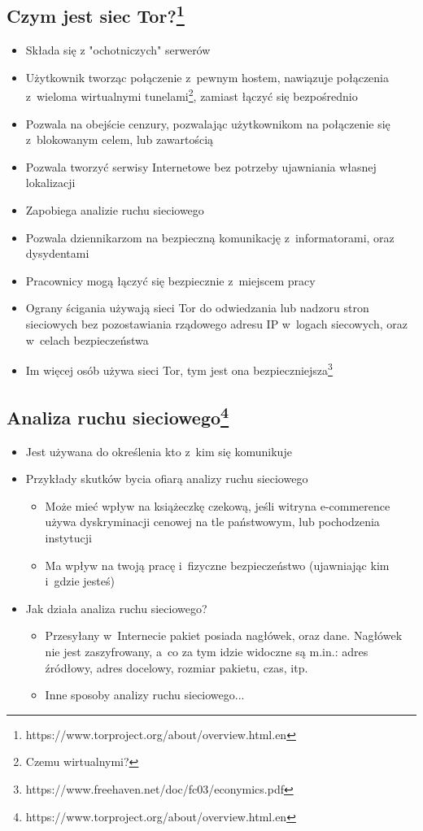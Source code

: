 \subsection{Czym jest siec Tor?\protect\footnote{https://www.torproject.org/about/overview.html.en}}
\begin{itemize}
 \item Składa się z "ochotniczych" serwerów
 \item Użytkownik tworząc połączenie z~pewnym hostem, nawiązuje połączenia z~wieloma wirtualnymi tunelami\footnote{Czemu wirtualnymi?}, zamiast łączyć się bezpośrednio
 \item Pozwala na obejście cenzury, pozwalając użytkownikom na połączenie się z~blokowanym celem, lub zawartością
 \item Pozwala tworzyć serwisy Internetowe bez potrzeby ujawniania własnej lokalizacji
 \item Zapobiega analizie ruchu sieciowego
 \item Pozwala dziennikarzom na bezpieczną komunikację z~informatorami, oraz dysydentami
 \item Pracownicy mogą łączyć się bezpiecznie z~miejscem pracy
 \item Ograny ścigania używają sieci Tor do odwiedzania lub nadzoru stron sieciowych bez pozostawiania rządowego adresu IP w~logach siecowych, oraz w~celach bezpieczeństwa
 \item Im więcej osób używa sieci Tor, tym jest ona bezpieczniejsza\footnote{https://www.freehaven.net/doc/fc03/econymics.pdf}
\end{itemize}

\subsection{Analiza ruchu sieciowego\footnote{https://www.torproject.org/about/overview.html.en}}
\begin{itemize}
 \item Jest używana do określenia kto z~kim się komunikuje
 \item Przykłady skutków bycia ofiarą analizy ruchu sieciowego
 \begin{itemize}
  \item Może mieć wpływ na książeczkę czekową, jeśli witryna e-commerence używa dyskryminacji cenowej na tle państwowym, lub pochodzenia instytucji
  \item Ma wpływ na twoją pracę i~fizyczne bezpieczeństwo (ujawniając kim i~gdzie jesteś)
 \end{itemize}
 \item Jak działa analiza ruchu sieciowego?
 \begin{itemize}
  \item Przesyłany w~Internecie pakiet posiada nagłówek, oraz dane. Nagłówek nie jest zaszyfrowany, a~co za tym idzie widoczne są m.in.: adres źródłowy, adres docelowy, rozmiar pakietu, czas, itp.
  \item Inne sposoby analizy ruchu sieciowego...
 \end{itemize}
\end{itemize}

